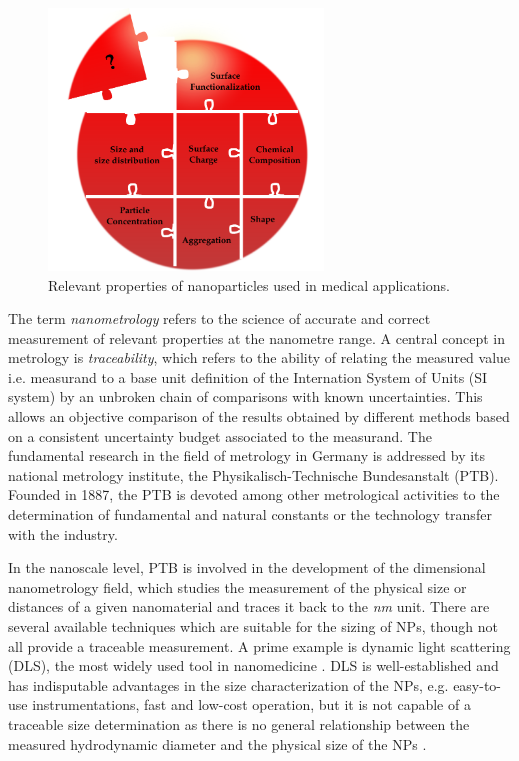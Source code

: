 \begin{figure}[hbt]%
	\centering
		\includegraphics[width=0.65\textwidth]{Figures/NanoparticlesProperties.pdf}
		\caption[Properties of nanoparticles]{Relevant properties of nanoparticles used in medical applications.}
		\label{fig:NanoparticlesProperties}
\end{figure}

The term \emph{nanometrology} refers to the science of accurate and correct measurement of relevant properties at the nanometre range. A central concept in metrology is \emph{traceability}, which refers to the ability of relating the measured value i.e. measurand to a base unit definition of the Internation System of Units (SI system) by an unbroken chain of comparisons with known uncertainties. This allows an objective comparison of the results obtained by different methods based on a consistent uncertainty budget associated to the measurand. The fundamental research in the field of metrology in Germany is addressed by its national metrology institute, the Physikalisch-Technische Bundesanstalt (PTB). Founded in 1887, the PTB is devoted among other metrological activities to the determination of fundamental and natural constants or the technology transfer with the industry.

In the nanoscale level, PTB is involved in the development of the dimensional nanometrology field, which studies the measurement of the physical size or distances of a given nanomaterial and traces it back to the \emph{nm} unit. There are several available techniques which are suitable for the sizing of NPs, though not all provide a traceable measurement. A prime example is dynamic light scattering (DLS), the most widely used tool in nanomedicine \citep{murphy_static_1997, hallett_vesicle_1991, egelhaaf_determination_1996, takahashi_precise_2008, jans_dynamic_2009, hoo_comparison_2008}. DLS is well-established and has indisputable advantages in the size characterization of the NPs, e.g. easy-to-use instrumentations, fast and low-cost operation, but it is not capable of a traceable size determination as there is no general relationship between the measured hydrodynamic diameter and the physical size of the NPs \citep{meli_traceable_2012}.

